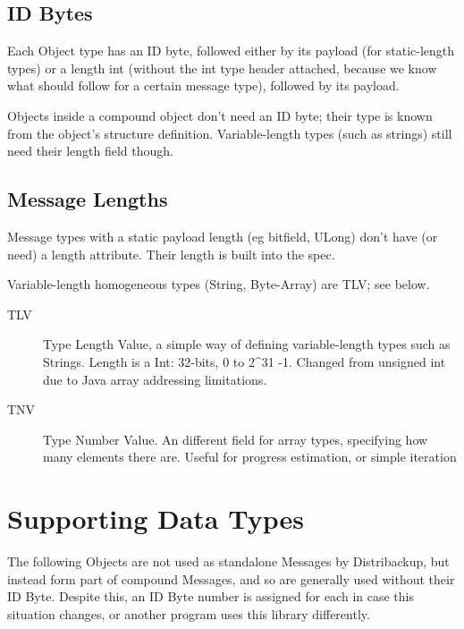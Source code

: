\documentclass[12pt,a4paper,]{adreport}
\begin{document}
\subsection{ID Bytes}\label{id-bytes}

Each Object type has an ID byte, followed either by its payload (for
static-length types) or a length int (without the int type header
attached, because we know what should follow for a certain message
type), followed by its payload.

Objects inside a compound object don't need an ID byte; their type is
known from the object's structure definition. Variable-length types
(such as strings) still need their length field though.

\subsection{Message Lengths}\label{message-lengths}

Message types with a static payload length (eg bitfield, ULong) don't
have (or need) a length attribute. Their length is built into the spec.

Variable-length homogeneous types (String, Byte-Array) are TLV; see
below.

\begin{description}
\item[TLV]
Type Length Value, a simple way of defining variable-length types such
as Strings. Length is a Int: 32-bits, 0 to 2\^{}31 -1. Changed from
unsigned int due to Java array addressing limitations.
\item[TNV]
Type Number Value. An different field for array types, specifying how
many elements there are. Useful for progress estimation, or simple
iteration
\end{description}

\section{Supporting Data Types}\label{supporting-data-types}

The following Objects are not used as standalone Messages by
Distribackup, but instead form part of compound Messages, and so are
generally used without their ID Byte. Despite this, an ID Byte number is
assigned for each in case this situation changes, or another program
uses this library differently.
\end{document}
